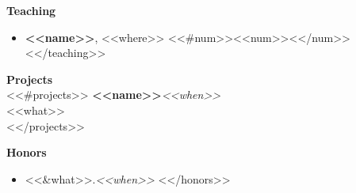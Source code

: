 \documentclass[11pt,a4paper,sans]{article}
\newcommand{\cvcolor}[1]{{\color{MidnightBlue}#1}}
\renewcommand{\section}[1]{
  \cvcolor{\noindent \textbf{\LARGE #1}}
  \vspace{.5em}\\
}
\begin{document}
\section{Teaching}
\vspace{-1em}
\begin{itemize}[leftmargin=*]
  <<#teaching>>
  \item \textbf{<<name>>}, <<where>> <<#num>><<num>><</num>>
  <</teaching>>
\end{itemize}
\vspace{1em}

\section{Projects}
<<#projects>>
\textbf{<<name>>}\hfill \textsl{<<when>>}\\
<<what>>\\
<</projects>>

\section{Honors}
\vspace{-1em}
\begin{itemize}[leftmargin=*]
  <<#honors>>
  \item <<&what>>.\hfill\textsl{<<when>>}
  <</honors>>
\end{itemize}
\vspace{1em}
\end{document}
